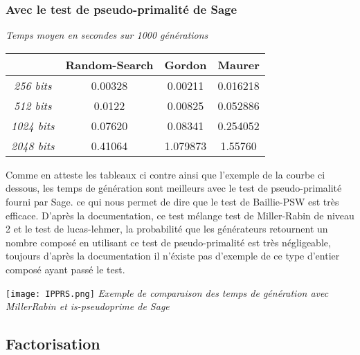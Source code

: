 \documentclass[a4paper,11pt]{article}
\begin{document}
\subsubsection{ Avec le test de pseudo-primalité de Sage} 

\begin{center}
\emph{Temps moyen en secondes sur 1000 générations}
 \begin{tabular}{||c | c | c | c ||} 
 \hline
 \textbf{} & \textbf{Random-Search} & \textbf{Gordon} & \textbf{Maurer} \\ [0.5ex] 
 \hline\hline
 \emph{256 bits} & 0.00328 & 0.00211  & 0.016218 \\ 
 \hline
 \emph{512 bits} & 0.0122 & 0.00825  & 0.052886 \\
 \hline
 \emph{1024 bits}  & 0.07620 & 0.08341 & 0.254052 \\
 \hline
 \emph{2048 bits} & 0.41064 &  1.079873 & 1.55760 \\
 \hline
\end{tabular}
\end{center}

Comme en atteste les tableaux ci contre ainsi que l'exemple de la courbe ci dessous, les temps de génération sont meilleurs avec le test de pseudo-primalité fourni par Sage. ce qui nous permet de dire que le test de Baillie-PSW est très efficace. D'après la documentation, ce test mélange test de Miller-Rabin de niveau 2 et le test de lucas-lehmer, la probabilité que les générateurs retournent un nombre composé en utilisant ce test de pseudo-primalité est très négligeable, toujours d'après la documentation il n'éxiste pas d'exemple de ce type d'entier composé ayant passé le test. 

{\centering 
\texttt{[image: IPPRS.png]} \newline
\hspace*{20mm}\emph{Exemple de comparaison des temps de génération avec MillerRabin et is-pseudoprime de Sage}
}\newline

\subsection{Factorisation }
\end{document}
